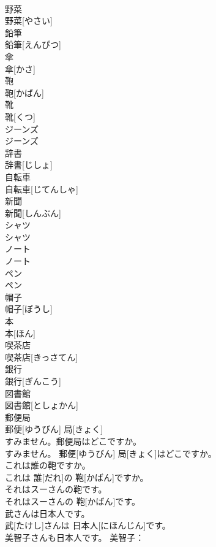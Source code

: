 \documentclass[8pt]{extreport}
\begin{document}
\begin{CJK}{UTF8}{min}
\\	野菜	
\\	野菜[やさい]		
\\	鉛筆	
\\	鉛筆[えんぴつ]		
\\	傘	
\\	傘[かさ]		
\\	鞄	
\\	鞄[かばん]		
\\	靴	
\\	靴[くつ]		
\\	ジーンズ	
\\	ジーンズ		
\\	辞書	
\\	辞書[じしょ]		
\\	自転車	
\\	自転車[じてんしゃ]		
\\	新聞	
\\	新聞[しんぶん]		
\\	シャツ	
\\	シャツ		
\\	ノート	
\\	ノート		
\\	ペン	
\\	ペン		
\\	帽子	
\\	帽子[ぼうし]		
\\	本	
\\	本[ほん]		
\\	喫茶店	
\\	喫茶店[きっさてん]		
\\	銀行	
\\	銀行[ぎんこう]		
\\	図書館	
\\	図書館[としょかん]		
\\	郵便局	
\\	郵便[ゆうびん] 局[きょく]		
\\	すみません。郵便局はどこですか。	
\\	すみません。 郵便[ゆうびん] 局[きょく]はどこですか。	
\\	これは誰の鞄ですか。	
\\	これは 誰[だれ]の 鞄[かばん]ですか。	
\\	それはスーさんの鞄です。	
\\	それはスーさんの 鞄[かばん]です。	
\\	武さんは日本人です。	
\\	武[たけし]さんは 日本人[にほんじん]です。	
\\	美智子さんも日本人です。	美智子：

\end{CJK}
\end{document}
